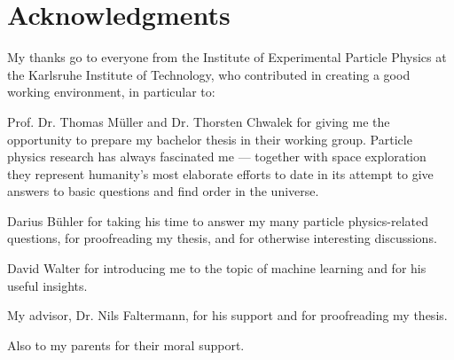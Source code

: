 \chapter*{Acknowledgments}

My thanks go to everyone from the Institute of Experimental Particle Physics at the Karlsruhe Institute of Technology, who contributed in creating a good working environment, in particular to:

Prof. Dr. Thomas Müller and Dr. Thorsten Chwalek for giving me the opportunity to prepare my bachelor thesis in their working group. Particle physics research has always fascinated me --- together with space exploration they represent humanity's most elaborate efforts to date in its attempt to give answers to basic questions and find order in the universe.

Darius Bühler for taking his time to answer my many particle physics-related questions, for proofreading my thesis, and for otherwise interesting discussions.

David Walter for introducing me to the topic of machine learning and for his useful insights.

My advisor, Dr. Nils Faltermann, for his support and for proofreading my thesis.

Also to my parents for their moral support.